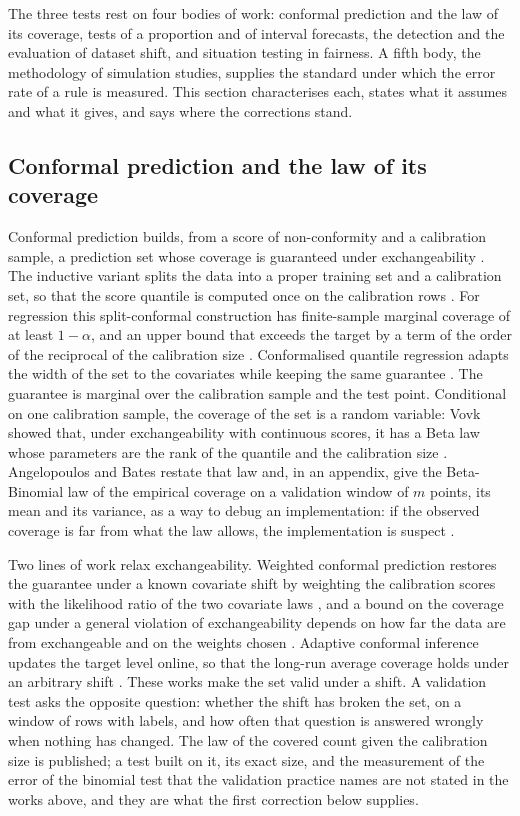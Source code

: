The three tests rest on four bodies of work: conformal prediction and the law of its coverage, tests of a proportion and of interval forecasts, the detection and the evaluation of dataset shift, and situation testing in fairness. A fifth body, the methodology of simulation studies, supplies the standard under which the error rate of a rule is measured. This section characterises each, states what it assumes and what it gives, and says where the corrections stand.

\subsection{Conformal prediction and the law of its coverage}

Conformal prediction builds, from a score of non-conformity and a calibration sample, a prediction set whose coverage is guaranteed under exchangeability \citep{vovk2022}. The inductive variant splits the data into a proper training set and a calibration set, so that the score quantile is computed once on the calibration rows \citep{papadopoulos2002}. For regression this split-conformal construction has finite-sample marginal coverage of at least $1-\alpha$, and an upper bound that exceeds the target by a term of the order of the reciprocal of the calibration size \citep{lei2018}. Conformalised quantile regression adapts the width of the set to the covariates while keeping the same guarantee \citep{romano2019}. The guarantee is marginal over the calibration sample and the test point. Conditional on one calibration sample, the coverage of the set is a random variable: Vovk showed that, under exchangeability with continuous scores, it has a Beta law whose parameters are the rank of the quantile and the calibration size \citep{vovk2012}. Angelopoulos and Bates restate that law and, in an appendix, give the Beta-Binomial law of the empirical coverage on a validation window of $m$ points, its mean and its variance, as a way to debug an implementation: if the observed coverage is far from what the law allows, the implementation is suspect \citep{angelopoulos2021}.

Two lines of work relax exchangeability. Weighted conformal prediction restores the guarantee under a known covariate shift by weighting the calibration scores with the likelihood ratio of the two covariate laws \citep{tibshirani2019}, and a bound on the coverage gap under a general violation of exchangeability depends on how far the data are from exchangeable and on the weights chosen \citep{barber2023}. Adaptive conformal inference updates the target level online, so that the long-run average coverage holds under an arbitrary shift \citep{gibbs2021}. These works make the set valid under a shift. A validation test asks the opposite question: whether the shift has broken the set, on a window of rows with labels, and how often that question is answered wrongly when nothing has changed. The law of the covered count given the calibration size is published; a test built on it, its exact size, and the measurement of the error of the binomial test that the validation practice names are not stated in the works above, and they are what the first correction below supplies.

